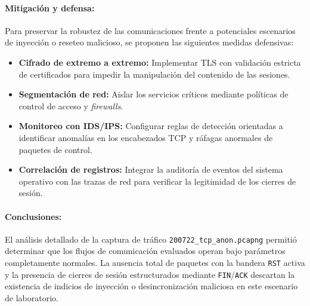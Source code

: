 \paragraph{Mitigación y defensa:}
Para preservar la robustez de las comunicaciones frente a potenciales escenarios de inyección o reseteo malicioso, se proponen las siguientes medidas defensivas:
\begin{itemize}
    \item \textbf{Cifrado de extremo a extremo:} Implementar TLS con validación estricta de certificados para impedir la manipulación del contenido de las sesiones.
    \item \textbf{Segmentación de red:} Aislar los servicios críticos mediante políticas de control de acceso y \textit{firewalls}.
    \item \textbf{Monitoreo con IDS/IPS:} Configurar reglas de detección orientadas a identificar anomalías en los encabezados TCP y ráfagas anormales de paquetes de control.
    \item \textbf{Correlación de registros:} Integrar la auditoría de eventos del sistema operativo con las trazas de red para verificar la legitimidad de los cierres de sesión.
\end{itemize}

\paragraph{Conclusiones:}
El análisis detallado de la captura de tráfico \texttt{200722\_tcp\_anon.pcapng} permitió determinar que los flujos de comunicación evaluados operan bajo parámetros completamente normales. La ausencia total de paquetes con la bandera \texttt{RST} activa y la presencia de cierres de sesión estructurados mediante \texttt{FIN}/\texttt{ACK} descartan la existencia de indicios de inyección o desincronización maliciosa en este escenario de laboratorio.

